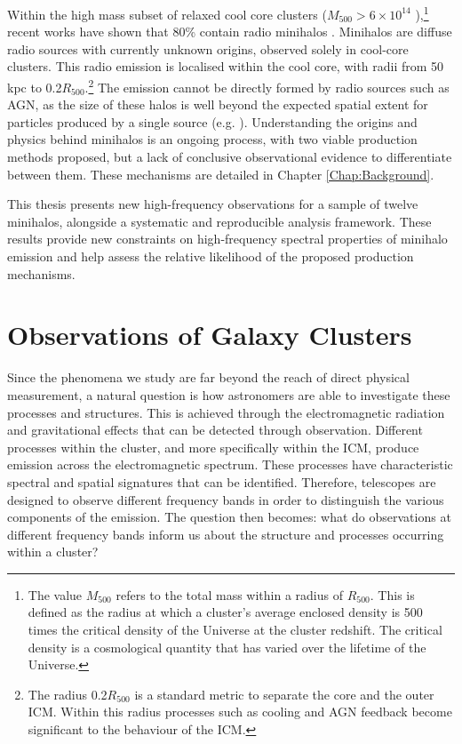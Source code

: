 Within the high mass subset of relaxed cool core clusters ($M_{500}>6\times10^{14}$ \Msun),\footnote{The value $M_{500}$ refers to the total mass within a radius of $R_{500}$. This is defined as the radius at which a cluster's average enclosed density is 500 times the critical density of the Universe at the cluster redshift. The critical density is a cosmological quantity that has varied over the lifetime of the Universe.} recent works have shown that 80\% contain radio minihalos \citep{Giacintucci2017}. Minihalos are diffuse radio sources with currently unknown origins, observed solely in cool-core clusters. This radio emission is localised within the cool core, with radii from 50 kpc to 0.2$R_{500}$.\footnote{The radius 0.2$R_{500}$ is a standard metric to separate the core and the outer ICM. Within this radius processes such as cooling and AGN feedback become significant to the behaviour of the ICM.} The emission cannot be directly formed by radio sources such as AGN, as the size of these halos is well beyond the expected spatial extent for particles produced by a single source (e.g. \citealp{Bagchi2002,Giacintucci2014}). Understanding the origins and physics behind minihalos is an ongoing process, with two viable production methods proposed, but a lack of conclusive observational evidence to differentiate between them. These mechanisms are detailed in Chapter \ref{Chap:Background}.

This thesis presents new high-frequency observations for a sample of twelve minihalos, alongside a systematic and reproducible analysis framework. These results provide new constraints on high-frequency spectral properties of minihalo emission and help assess the relative likelihood of the proposed production mechanisms.

\section{Observations of Galaxy Clusters}

Since the phenomena we study are far beyond the reach of direct physical measurement, a natural question is how astronomers are able to investigate these processes and structures. This is achieved through the electromagnetic radiation and gravitational effects that can be detected through observation. Different processes within the cluster, and more specifically within the ICM, produce emission across the electromagnetic spectrum. These processes have characteristic spectral and spatial signatures that can be identified. Therefore, telescopes are designed to observe different frequency bands in order to distinguish the various components of the emission. The question then becomes: what do observations at different frequency bands inform us about the structure and processes occurring within a cluster? 

